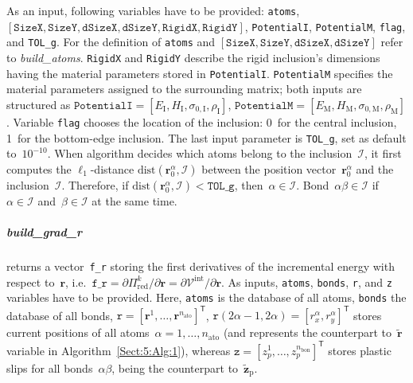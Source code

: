 \documentclass[preprint,12pt,authoryear]{elsarticle}
\newcommand{\bs}[1]{{\boldsymbol{#1}}}
\begin{document}
As an input, following variables have to be provided: \texttt{atoms}, $[\texttt{SizeX},\allowbreak\texttt{SizeY},\allowbreak\texttt{dSizeX},\allowbreak\texttt{dSizeY},\allowbreak\texttt{RigidX},\allowbreak\texttt{RigidY}]$, \texttt{PotentialI}, \texttt{PotentialM}, \texttt{flag}, and \texttt{TOL\_g}. For the definition of \texttt{atoms} and $[\texttt{SizeX},\allowbreak\texttt{SizeY},\allowbreak\texttt{dSizeX},\allowbreak\texttt{dSizeY}]$ refer to \emph{build\_atoms}. \texttt{RigidX} and \texttt{RigidY} describe the rigid inclusion's dimensions having the material parameters stored in \texttt{PotentialI}. \texttt{PotentialM} specifies the material parameters assigned to the surrounding matrix; both inputs are structured as $\texttt{PotentialI}=[E_\mathrm{I},H_\mathrm{I},\sigma_{0,\mathrm{I}},\rho_\mathrm{I}]$, $\texttt{PotentialM}=[E_\mathrm{M},H_\mathrm{M},\sigma_{0,\mathrm{M}},\rho_\mathrm{M}]$. Variable \texttt{flag} chooses the location of the inclusion: 0~for the central inclusion, 1~for the bottom-edge inclusion. The last input parameter is \texttt{TOL\_g}, set as default to~$10^{-10}$. When algorithm decides which atoms belong to the inclusion~$\mathscr{I}$, it first computes the $\ell_1$-distance $\mathrm{dist}(\bs{r}_0^\alpha,\mathscr{I})$ between the position vector~$\bs{r}_0^\alpha$ and the inclusion~$\mathscr{I}$. Therefore, if $\mathrm{dist}(\bs{r}_0^\alpha,\mathscr{I})<\texttt{TOL\_g}$, then~$\alpha\in\mathscr{I}$. Bond~$\alpha\beta\in\mathscr{I}$ if~$\alpha\in\mathscr{I}$ and~$\beta\in\mathscr{I}$ at the same time.
%
%
\subparagraph{build\_grad\_r} returns a vector~\texttt{f\_r} storing the first derivatives of the incremental energy with respect to~$\bs{r}$, i.e.~$\texttt{f\_r}=\partial\Pi^k_\mathrm{red}/\partial\bs{r}=\partial\mathcal{V}^\mathrm{int}/\partial\bs{r}$. As inputs, \texttt{atoms}, \texttt{bonds}, \texttt{r}, and \texttt{z} variables have to be provided. Here, \texttt{atoms} is the database of all atoms, \texttt{bonds} the database of all bonds, $\texttt{r}=[\bs{r}^1,\dots,\bs{r}^{n_\mathrm{ato}}]^\mathsf{T}$, $\texttt{r}(2\alpha-1,2\alpha)=[r_x^\alpha,r_y^\alpha]^\mathsf{T}$ stores current positions of all atoms~$\alpha=1,\dots,n_\mathrm{ato}$ (and represents the counterpart to~$\widetilde{\bs{r}}$ variable in Algorithm~\ref{Sect:5:Alg:1}), whereas $\texttt{z}=[z_p^1,\dots,z_p^{n_\mathrm{bon}}]^\mathsf{T}$ stores plastic slips for all bonds~$\alpha\beta$, being the counterpart to~$\widetilde{\bs{z}}_\mathrm{p}$.
%
%
\end{document}
